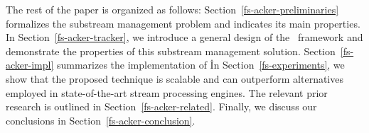The rest of the paper is organized as follows: Section~\ref{fs-acker-preliminaries} formalizes the substream management problem and indicates its main properties. In Section~\ref{fs-acker-tracker}, we introduce a general design of the \tracker\ framework and demonstrate the properties of this substream management solution. Section~\ref{fs-acker-impl} summarizes the implementation of \tracker\. In Section~\ref{fs-experiments}, we show that the proposed technique is scalable and can outperform alternatives employed in state-of-the-art stream processing engines. The relevant prior research is outlined in Section~\ref{fs-acker-related}. Finally, we discuss our conclusions in Section~\ref{fs-acker-conclusion}.